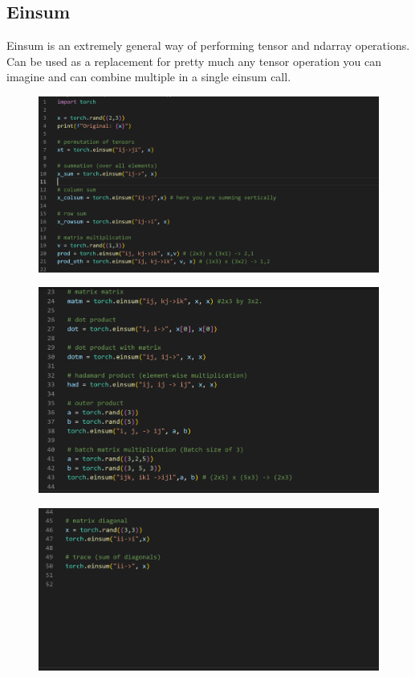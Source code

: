 \documentclass[12pt]{article}
\begin{document}
\subsection{Einsum} Einsum is an extremely general way of performing tensor and ndarray operations. Can be used as a replacement for pretty much any tensor operation you can imagine and can combine multiple in a single einsum call.
\begin{figure}[H]
    \centering
    \includegraphics[width=1.0\textwidth]{./einsum_1.png} %
\end{figure}
\begin{figure}[H]
    \centering
    \includegraphics[width=1.0\textwidth]{./einsum_2.png} %
\end{figure}
\begin{figure}[H]
    \centering
    \includegraphics[width=1.0\textwidth]{./einsum_3.png} %
\end{figure}
\end{document}
